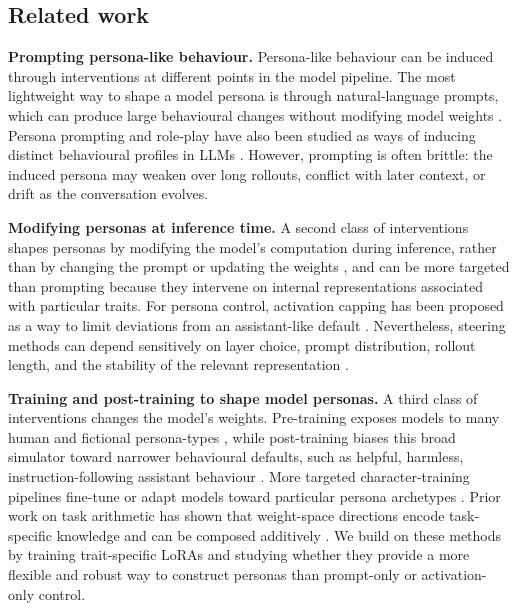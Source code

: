 \subsection{Related work}\label{sec:related-work}
\textbf{Prompting persona-like behaviour.}
Persona-like behaviour can be induced through interventions at different points in the model pipeline. The most lightweight way to shape a model persona is through natural-language prompts, which can produce large behavioural changes without modifying model weights \citep{askell2021general, brown2020language, ouyang2022instructgpt, bai2022constitutional}. Persona prompting and role-play have also been studied as ways of inducing distinct behavioural profiles in LLMs \citep{deshpande2023toxicity, park2023generative, shanahan2023role}. However, prompting is often brittle: the induced persona may weaken over long rollouts, conflict with later context, or drift as the conversation evolves.

\textbf{Modifying personas at inference time.}
A second class of interventions shapes personas by modifying the model's computation during inference, rather than by changing the prompt or updating the weights \citep{turner2023activation, zou2023representation, rimsky2024steering, arditi2024refusal, chen2025persona}, and can be more targeted than prompting because they intervene on internal representations associated with particular traits. For persona control, activation capping has been proposed as a way to limit deviations from an assistant-like default \citep{lu2026assistant}. Nevertheless, steering methods can depend sensitively on layer choice, prompt distribution, rollout length, and the stability of the relevant representation \citep{tan2024analysing}.

\textbf{Training and post-training to shape model personas.}
A third class of interventions changes the model's weights. Pre-training exposes models to many human and fictional persona-types \citep{tice2026alignmentpretraining}, while post-training biases this broad simulator toward narrower behavioural defaults, such as helpful, harmless, instruction-following assistant behaviour \citep{ouyang2022instructgpt, bai2022constitutional, lu2026assistant}. More targeted character-training pipelines fine-tune or adapt models toward particular persona archetypes \citep{maiya2025opencharacter, li2025big5}. Prior work on task arithmetic has shown that weight-space directions encode task-specific knowledge and can be composed additively \citep{ilharco2023editing,huang2024chatvectorsimpleapproach}. We build on these methods by training trait-specific LoRAs and studying whether they provide a more flexible and robust way to construct personas than prompt-only or activation-only control.